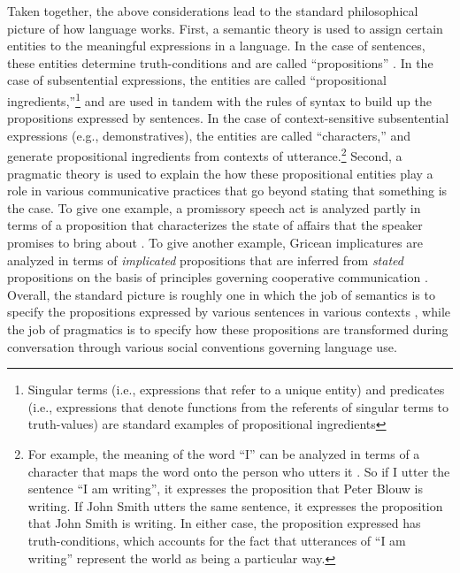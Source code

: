 Taken together, the above considerations lead to the standard philosophical picture of how language works. First, a semantic theory is used to assign certain entities to the meaningful expressions in a language. In the case of sentences, these entities determine truth-conditions and are called ``propositions'' \citep{Speaks:2014}. In the case of subsentential expressions, the entities are called ``propositional ingredients,''\footnote{Singular terms (i.e., expressions that refer to a unique entity) and predicates (i.e., expressions that denote functions from the referents of singular terms to truth-values) are standard examples of propositional ingredients} and are used in tandem with the rules of syntax to build up the propositions expressed by sentences. In the case of context-sensitive subsentential expressions (e.g., demonstratives), the entities are called ``characters,'' and generate propositional ingredients from contexts of utterance.\footnote{For example, the meaning of the word ``I'' can be analyzed in terms of a character that maps the word onto the person who utters it \citep{Stanley:2008}. So if I utter the sentence ``I am writing'', it expresses the proposition that Peter Blouw is writing. If John Smith utters the same sentence, it expresses the proposition that John Smith is writing. In either case, the proposition expressed has truth-conditions, which accounts for the fact that utterances of ``I am writing'' represent the world as being a particular way.} Second, a pragmatic theory is used to explain the how these propositional entities play a role in various communicative practices that go beyond stating that something is the case. To give one example, a promissory speech act is analyzed partly in terms of a proposition that characterizes the state of affairs that the speaker promises to bring about \citep{KortaPerry:2015}. To give another example, Gricean implicatures are analyzed in terms of \textit{implicated} propositions that are inferred from \textit{stated} propositions on the basis of principles governing cooperative communication \citep{Grice:1975,KortaPerry:2015}. Overall, the standard picture is roughly one in which the job of semantics is to specify the propositions expressed by various sentences in various contexts \citep{Soames:2010,Recanati:2012,CappelenLepore:2005}, while the job of pragmatics is to specify how these propositions are transformed during conversation through various social conventions governing language use. 

